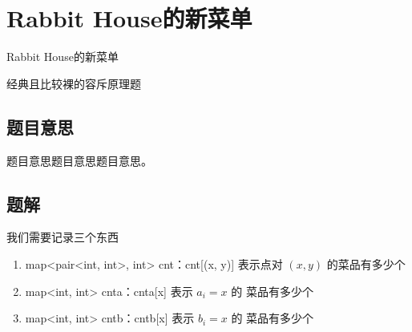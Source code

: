\def\sectionName{Rabbit House的新菜单}
\section{\sectionName}



\begin{frame}

\isBeamerMode\relax
    {\Huge \sectionName}\par
\fi




经典且比较裸的容斥原理题



\end{frame}

\subsection{题目意思}
\begin{frame} %
题目意思题目意思题目意思。
\end{frame}



\subsection{题解}


\begin{frame} %
我们需要记录三个东西

\begin{enumerate}
	\item map<pair<int, int>, int> cnt：cnt[(x, y)] 表示点对 $(x, y)$ 的菜品有多少个
	\item map<int, int> cnta：cnta[x] 表示 $a_i = x$ 的 菜品有多少个
	\item map<int, int> cntb：cntb[x] 表示 $b_i = x$ 的 菜品有多少个
\end{enumerate}
\end{frame}


